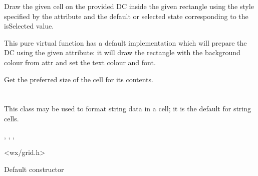 

\label{wxgridcellrendererdraw}


Draw the given cell on the provided DC inside the given rectangle
using the style specified by the attribute and the default or selected
state corresponding to the isSelected value.

This pure virtual function has a default implementation which will
prepare the DC using the given attribute: it will draw the rectangle
with the background colour from attr and set the text colour and font.

\label{wxgridcellrenderergetbestsize}


Get the preferred size of the cell for its contents.

\label{wxgridcellrendererclone}


\section{}\label{wxgridcellstringrenderer}

This class may be used to format string data in a cell; it is the default
for string cells.




,\rtfsp
{},\rtfsp
{},\rtfsp
{}


<wx/grid.h>




\label{wxgridcellstringrendererconstr}


Default constructor


